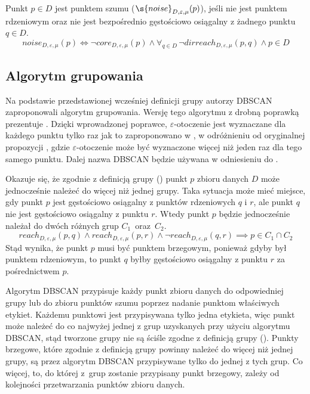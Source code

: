 \newline
Punkt $ p\in D $ jest punktem szumu ($ \s{noise}_{D,\varepsilon,\mu}(p) $), jeśli nie jest punktem rdzeniowym oraz nie jest bezpośrednio gęstościowo osiągalny z żadnego punktu $q \in D$. 
\begin{equation}
	noise_{D,\varepsilon,\mu}(p) \iff \neg core_{D,\varepsilon,\mu}(p) \land \forall_{q\in D}\,\neg dirreach_{D,\varepsilon,\mu}(p, q) \land p \in D
\end{equation}

\subsection{Algorytm grupowania}
Na podstawie przedstawionej wcześniej definicji grupy autorzy DBSCAN zaproponowali algorytm grupowania. Wersję tego algorytmu z drobną poprawką prezentuje . Dzięki wprowadzonej poprawce, $ \varepsilon $-otoczenie jest wyznaczane dla każdego punktu tylko raz jak to zaproponowano w \cite{fasterdbscan}, w odróżnieniu od oryginalnej propozycji \cite{dbscan}, gdzie $ \varepsilon $-otoczenie może być wyznaczone więcej niż jeden raz dla tego samego punktu. Dalej nazwa DBSCAN będzie używana w odniesieniu do .

Okazuje się, że zgodnie z definicją grupy () punkt $ p $ zbioru danych $ D $ może jednocześnie należeć do więcej niż jednej grupy. Taka sytuacja może mieć miejsce, gdy punkt $ p $ jest gęstościowo osiągalny z punktów rdzeniowych $ q $ i $ r $, ale punkt $ q $ nie jest gęstościowo osiągalny z punktu $ r $. Wtedy punkt $ p $ będzie jednocześnie należał do dwóch różnych grup \mbox{$ C_1 $ oraz $ C_2 $}.
\begin{equation}
  reach_{D,\varepsilon,\mu}(p, q) \land reach_{D,\varepsilon,\mu}(p, r) \land 
  \neg reach_{D,\varepsilon,\mu}(q, r) \implies
  p \in C_1 \cap C_2
\end{equation}
Stąd wynika, że punkt $ p $ musi być punktem brzegowym, ponieważ gdyby był punktem rdzeniowym, to punkt $ q $ byłby gęstościowo osiągalny z punktu $ r $ za pośrednictwem $ p $.

Algorytm DBSCAN przypisuje każdy punkt zbioru danych do odpowiedniej grupy lub do zbioru punktów szumu poprzez nadanie punktom właściwych etykiet. Każdemu punktowi jest przypisywana tylko jedna etykieta, więc punkt może należeć do co najwyżej jednej z grup uzyskanych przy użyciu algorytmu DBSCAN, stąd tworzone grupy nie są ściśle zgodne z definicją grupy (). Punkty brzegowe, które zgodnie z definicją grupy powinny należeć do więcej niż jednej grupy, są przez algorytm DBSCAN przypisywane tylko do jednej z tych grup. Co więcej, to, do której \mbox{z grup} zostanie przypisany punkt brzegowy, zależy od kolejności przetwarzania punktów zbioru danych.

